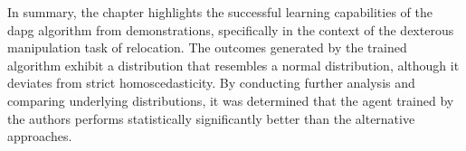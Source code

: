 In summary, the chapter highlights the successful learning capabilities of the \gls{dapg} algorithm from demonstrations, specifically in the context of the dexterous manipulation task of relocation. The outcomes generated by the trained algorithm exhibit a distribution that resembles a normal distribution, although it deviates from strict homoscedasticity. By conducting further analysis and comparing underlying distributions, it was determined that the agent trained by the authors performs statistically significantly better than the alternative approaches.